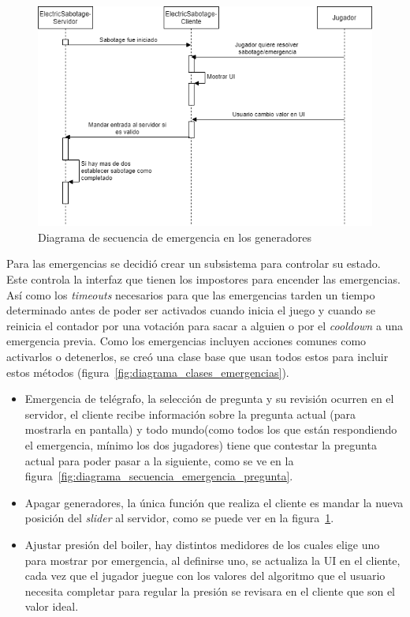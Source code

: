         \begin{figure}[p]
            \centering
            \includegraphics[width=1\linewidth]{images/DiagramaSecuenciaSabotageGeneradores.png}
            \caption{Diagrama de secuencia de emergencia en los generadores}
            \label{fig:diagrama_secuencia_generadores}
        \end{figure}
Para las emergencias se decidió crear un subsistema para controlar su estado. Este controla la interfaz que tienen los impostores para encender las emergencias. Así como los \textit{timeouts} necesarios para que las emergencias tarden un tiempo determinado antes de poder ser activados cuando inicia el juego y cuando se reinicia el contador por una votación para sacar a alguien o por el \textit{cooldown} a una emergencia previa.
Como los emergencias incluyen acciones comunes como activarlos o detenerlos, se creó una clase base que usan todos estos para incluir estos métodos (figura~\ref{fig:diagrama_clases_emergencias}).
\begin{itemize}
    \item Emergencia de telégrafo, la selección de pregunta y su revisión ocurren en el servidor, el cliente recibe información sobre la pregunta actual (para mostrarla en pantalla) y todo mundo(como todos los que están respondiendo el emergencia, mínimo los dos jugadores) tiene que contestar la pregunta actual para poder pasar a la siguiente, como se ve en la figura~\ref{fig:diagrama_secuencia_emergencia_pregunta}.
    \item Apagar generadores, la única función que realiza el cliente es mandar la nueva posición del \textit{slider} al servidor, como se puede ver en la figura~\ref{fig:diagrama_secuencia_generadores}.
    \item Ajustar presión del boiler, hay distintos medidores de los cuales elige uno para mostrar por emergencia, al definirse uno, se actualiza la UI en el cliente, cada vez que el jugador juegue con los valores del algoritmo que el usuario necesita completar para regular la presión se revisara en el cliente que son el valor ideal.
\end{itemize}

